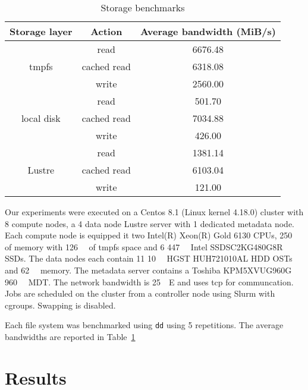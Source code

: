       \begin{table}
      \centering
      \begin{tabular}{@{}|c|c|c|@{}}
       \hline
       Storage layer & Action & Average bandwidth (MiB/s) \\
              \hline
       \multirow{3}{*}{tmpfs} & read & 6676.48 \\
       & cached read & 6318.08  \\
       & write & 2560.00 \\
       \hline
       \multirow{3}{*}{local disk} & read & 501.70  \\
       & cached read & 7034.88 \\
       & write & 426.00 \\
       \hline
       \multirow{3}{*}{Lustre} & read & 1381.14 \\
       & cached read & 6103.04  \\
       & write & 121.00  \\

       \hline

      \end{tabular}
      \caption{Storage benchmarks}
      \label{table:fs}
      \end{table}
            Our experiments were executed on a Centos 8.1 (Linux kernel 4.18.0) cluster with 8 compute nodes,
      a 4 data node Lustre server with 1 dedicated metadata node. Each compute node
      is equipped it two Intel(R) Xeon(R) Gold 6130 CPUs, \SI{250}{\gibi\byte} of memory with
      \SI{126}{\gibi\byte} of tmpfs space and 6 \SI{447}{\gibi\byte} Intel SSDSC2KG480G8R SSDs.
      The data nodes each contain 11 \SI{10}{\tera\byte} HGST HUH721010AL HDD OSTs
      and \SI{62}{\gibi\byte} memory. The metadata server contains a Toshiba KPM5XVUG960G \SI{960}{\giga\byte} MDT.
      The network bandwidth is \SI{25}{\giga\bit}E and uses tcp for communcation.
      Jobs are scheduled on the cluster from a controller node using Slurm with cgroups. Swapping is
      disabled.

      Each file system was benchmarked using \texttt{dd} using 5 repetitions. The average bandwidths are
      reported in Table~\ref{table:fs}


\section{Results}

